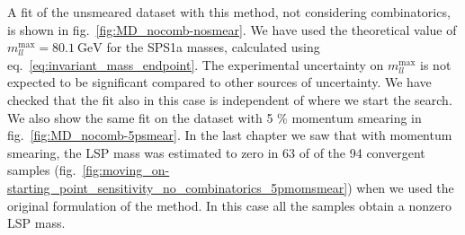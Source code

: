 \documentclass[twoside,english]{uiofysmaster}
\begin{document}
A fit of the unsmeared dataset with this method, not considering combinatorics, is shown in fig.\ \ref{fig:MD_nocomb-nosmear}. We have used the theoretical value of $m_{ll}^\mathrm{max} = 80.1~\mathrm{GeV}$ for the SPS1a masses, calculated using eq.\ \eqref{eq:invariant_mass_endpoint}. The experimental uncertainty on $m_{ll}^\mathrm{max}$ is not expected to be significant compared to other sources of uncertainty. We have checked that the fit also in this case is independent of where we start the search. We also show the same fit on the dataset with 5 \% momentum smearing in fig.\ \ref{fig:MD_nocomb-5psmear}. In the last chapter we saw that with momentum smearing, the LSP mass was estimated to zero in 63 of of the 94 convergent samples (fig.\ \ref{fig:moving_on-starting_point_sensitivity_no_combinatorics_5pmomsmear}) when we used the original formulation of the method. In this case all the samples obtain a nonzero LSP mass.
\end{document}
